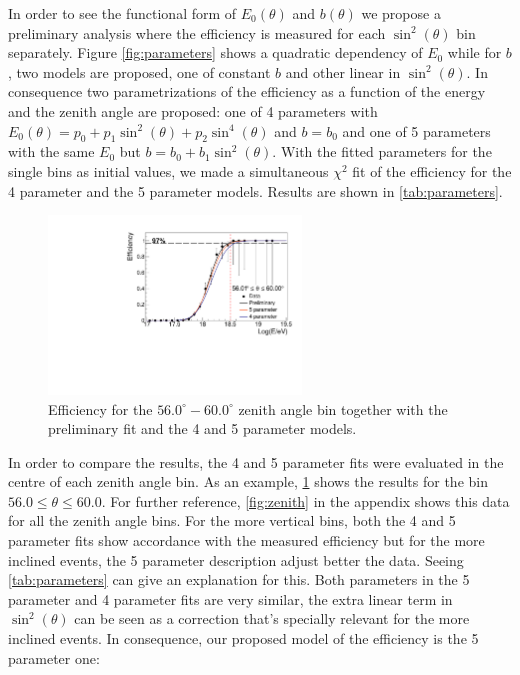 \documentclass[12pt,a4paper]{article}
\begin{document}
In order to see the functional form of $E_0(\theta)$ and $b(\theta)$ we propose a preliminary analysis where the efficiency is measured for each $\sin^2(\theta)$ bin separately. Figure \ref{fig:parameters} shows a quadratic dependency of $E_0$ while for $b$, two models are proposed, one of constant $b$ and other linear in $\sin^2(\theta)$. In consequence two parametrizations of the efficiency as a function of the energy and the zenith angle are proposed: one of 4 parameters with $E_0(\theta)=p_0 + p_1\sin^2(\theta) + p_2\sin^4(\theta)$ and $b=b_0$ and one of 5 parameters with the same $E_0$ but $b=b_0+b_1\sin^2(\theta)$. With the fitted parameters for the single bins as initial values, we made a simultaneous $\chi^2$ fit of the efficiency for the 4 parameter and the 5 parameter models. Results are shown in \cref{tab:parameters}.

\begin{figure}[t]
    \begin{center}
        \includegraphics[width=0.6\textwidth]{plots/singleZenithFit.pdf}
        \caption{Efficiency for the $56.0^{\circ}-60.0^{\circ}$ zenith angle bin together with the preliminary fit and the 4 and 5 parameter models.
        \label{fig:zenithSingle}}
        \vspace{-0.5cm}
    \end{center}
\end{figure}

In order to compare the results, the 4 and 5 parameter fits were evaluated in the centre of each zenith angle bin. As an example, \cref{fig:zenithSingle} shows the results for the bin $56.0 \leq \theta \leq 60.0$. For further reference, \cref{fig:zenith} in the appendix shows this data for all the zenith angle bins. For the more vertical bins, both the 4 and 5 parameter fits show accordance with the measured efficiency but for the more inclined events, the 5 parameter description adjust better the data. Seeing \ref{tab:parameters} can give an explanation for this. Both parameters in the 5 parameter and 4 parameter fits are very similar, the extra linear term in $\sin^2(\theta)$ can be seen as a correction that's specially relevant for the more inclined events. In consequence, our proposed model of the efficiency is the 5 parameter one:
\end{document}
